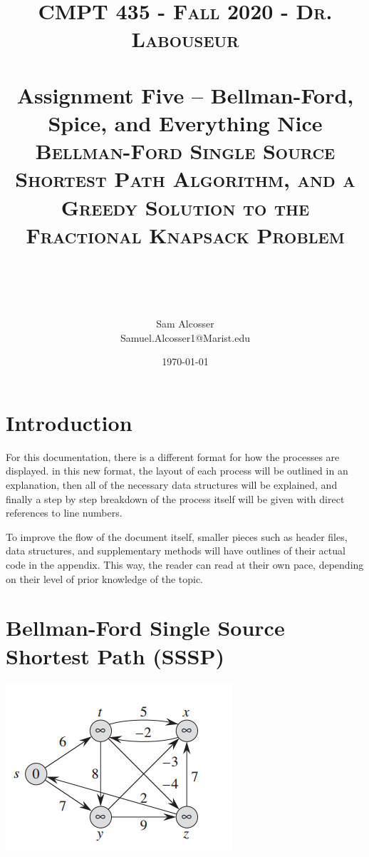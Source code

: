 \documentclass[letterpaper, 10pt]{article}
\title{	
   \normalfont \normalsize 
   \textsc{CMPT 435 - Fall 2020 - Dr. Labouseur} \\[10pt] %
   \horrule{0.5pt} \\[0.25cm] 	%
   \large{Assignment Five -- Bellman-Ford, Spice, and Everything Nice} \\
   \textsc{Bellman-Ford Single Source Shortest Path Algorithm, and a Greedy Solution to the Fractional Knapsack Problem}\\[20pt]%
 \author{Sam Alcosser \\ \normalsize Samuel.Alcosser1@Marist.edu}
   \horrule{0.5pt} \\ 	%
   


  
\date{\normalsize\today} 
}
\begin{document}
\selectfont
\maketitle
\tableofcontents
\newpage

\section{Introduction}

For this documentation, there is a different format for how the processes are displayed. in this new format, the layout of each process will be outlined in an explanation, then all of the necessary data structures will be explained, and finally a step by step breakdown of the process itself will be given with direct references to line numbers. 

To improve the flow of the document itself, smaller pieces such as header files, data structures, and supplementary methods will have outlines of their actual code in the appendix. This way, the reader can read at their own pace, depending on their level of prior knowledge of the topic.



\section{Bellman-Ford Single Source Shortest Path (SSSP)}
\begin{center}
 \includegraphics[width=\textwidth / 2 ]{Bellman-Ford-Algorithm-1.png}
 \end{center}
 
\end{document}

